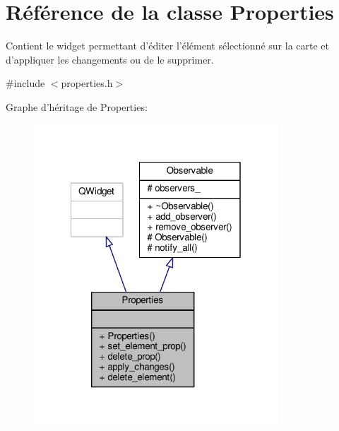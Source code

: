 \hypertarget{classProperties}{\section{Référence de la classe Properties}
\label{classProperties}
}


Contient le widget permettant d’éditer l’élément sélectionné sur la carte et d’appliquer les changements ou de le supprimer.  




{\ttfamily \#include $<$properties.\+h$>$}



Graphe d'héritage de Properties\+:\nopagebreak
\begin{figure}[H]
\begin{center}
\leavevmode
\includegraphics[width=259pt]{de/d7f/classProperties__inherit__graph}
\end{center}
\end{figure}


